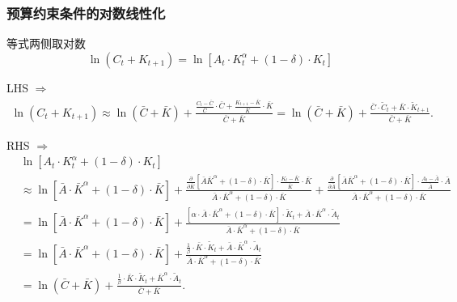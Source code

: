 \subsubsection{预算约束条件的对数线性化}
等式两侧取对数
\begin{equation*}
  \ln (C_t + K_{t+1}) = \ln \left[ A_t \cdot K_t^{\alpha} + (1-\delta) \cdot K_t\right]
\end{equation*}

LHS $\Rightarrow$
\begin{align*}
  \ln (C_t + K_{t+1}) \approx \ln \left(\bar{C} + \bar{K} \right) + \frac{
  \frac{C_t - \bar{C}}{\bar{C}} \cdot \bar{C} + \frac{K_{t+1} - \bar{K}}{\bar{K}} \cdot \bar{K}
  }{\bar{C}+\bar{K}} = \ln \left(\bar{C} + \bar{K} \right) + \frac{\bar{C} \cdot  \tilde{C}_{t} + \bar{K} \cdot \tilde{K}_{t+1} }{\bar{C}+\bar{K}}.
\end{align*}

RHS $\Rightarrow$
\begin{align*}
  &\ln \left[ A_t \cdot K_t^{\alpha} + (1-\delta) \cdot K_t\right] \\ & \approx \ln \left[ \bar{A} \cdot \bar{K}^{\alpha} + (1-\delta) \cdot \bar{K} \right] + \frac{
  \frac{\partial }{\partial \bar{K}} \left[\bar{A} \bar{K}^{\alpha} + (1-\delta) \cdot \bar{K}\right] \cdot \frac{K_t - \bar{K}}{\bar{K}} \cdot \bar{K}
  }{\bar{A} \cdot \bar{K}^{\alpha} + (1-\delta) \cdot \bar{K} } +
  \frac{
  \frac{\partial }{\partial \bar{A}} \left[\bar{A} \bar{K}^{\alpha} + (1-\delta) \cdot \bar{K}\right] \cdot \frac{A_t - \bar{A}}{\bar{A}} \cdot \bar{A}
  }{\bar{A} \cdot \bar{K}^{\alpha} + (1-\delta) \cdot \bar{K} }\\
  &= \ln \left[ \bar{A} \cdot \bar{K}^{\alpha} + (1-\delta) \cdot \bar{K} \right] + \frac{
  \left[ \alpha \cdot \bar{A} \cdot \bar{K}^{\alpha} + (1-\delta) \cdot \bar{K} \right] \cdot \tilde{K}_{t} + \bar{A} \cdot \bar{K}^{\alpha} \cdot \tilde{A}_{t}
  }{
  \bar{A} \cdot \bar{K}^{\alpha} + (1-\delta) \cdot \bar{K}
  } \\
  &=\ln \left[ \bar{A} \cdot \bar{K}^{\alpha} + (1-\delta) \cdot \bar{K}\right]+ \frac{\frac{1}{\beta} \cdot \bar{K} \cdot \tilde{K}_t + \bar{A} \cdot \bar{K}^{\alpha} \cdot \tilde{A}_t}{
  \bar{A} \cdot \bar{K}^{\alpha} + (1-\delta) \cdot \bar{K}
  } \\
  &= \ln \left(
  \bar{C}+\bar{K}
  \right) +
  \frac{
  \frac{1}{\beta} \cdot \bar{K} \cdot \tilde{K}_t + \bar{K}^{\alpha} \cdot \tilde{A}_t
  }{\bar{C}+\bar{K}}.
\end{align*}

